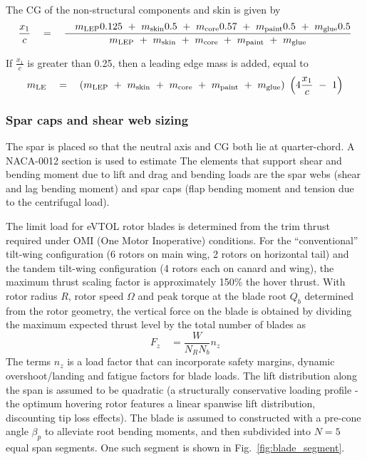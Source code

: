 The CG of the non-structural components and skin is given by 
\begin{equation*}
\frac{x_1}{c} \quad = \quad \frac{\quad m_{\rm LEP} 0.125 \textrm{ }+\textrm{ }  m_{\rm skin} 0.5 \textrm{ }+\textrm{ } m_{\rm core}  0.57 \textrm{ }+\textrm{ } m_{\rm paint} 0.5 \textrm{ }+\textrm{ } m_{\rm glue} 0.5}{m_{\rm LEP} \textrm{ }+\textrm{ } m_{\rm skin} \textrm{ }+\textrm{ } m_{\rm core} \textrm{ }+\textrm{ } m_{\rm paint} \textrm{ }+\textrm{ } m_{\rm glue}}
\end{equation*}

If $\frac{x_1}{c}$ is greater than 0.25, then a leading edge mass is added, equal to 
\begin{equation*}
m_{\rm LE} \quad = \quad (m_{\rm LEP} \textrm{ }+\textrm{ } m_{\rm skin} \textrm{ }+\textrm{ } m_{\rm core} \textrm{ }+\textrm{ } m_{\rm paint} \textrm{ }+\textrm{ } m_{\rm glue}) \textrm{ } \left(4 \frac{x_1}{c} \textrm{ } - \textrm{ } 1\right)
\end{equation*}

\subsubsection{Spar caps and shear web sizing}
The spar is placed so that the neutral axis and CG both lie at quarter-chord. A NACA-0012 section is used to estimate The elements that support shear and bending moment due to lift and drag and bending loads are the spar webs (shear and lag bending moment) and spar caps (flap bending moment and tension due to the centrifugal load). 

The limit load for eVTOL rotor blades is determined from the trim thrust required under OMI (One Motor Inoperative) conditions. For the ``conventional'' tilt-wing configuration (6 rotors on main wing, 2 rotors on horizontal tail) and the tandem tilt-wing configuration (4 rotors each on canard and wing), the maximum thrust scaling factor is approximately 150\% the hover thrust. With rotor radius $R$, rotor speed $\Omega$ and peak torque at the blade root $Q_b$ determined from the rotor geometry, the vertical force on the blade is obtained by dividing the maximum expected thrust level by the total number of blades as 
\begin{equation}
F_z \quad = \frac{W}{N_R N_b} n_z
\end{equation} 
The terms $n_z$ is a load factor that can incorporate safety margins, dynamic overshoot/landing and fatigue factors for blade loads. The lift distribution along the span is assumed to be quadratic (a structurally conservative loading profile - the optimum hovering rotor features a linear spanwise lift distribution, discounting tip loss effects). The blade is assumed to constructed with a pre-cone angle $\beta_p$ to alleviate root bending moments, and then subdivided into $N=5$ equal span segments. One such segment is shown in Fig.~\ref{fig:blade_segment}.


